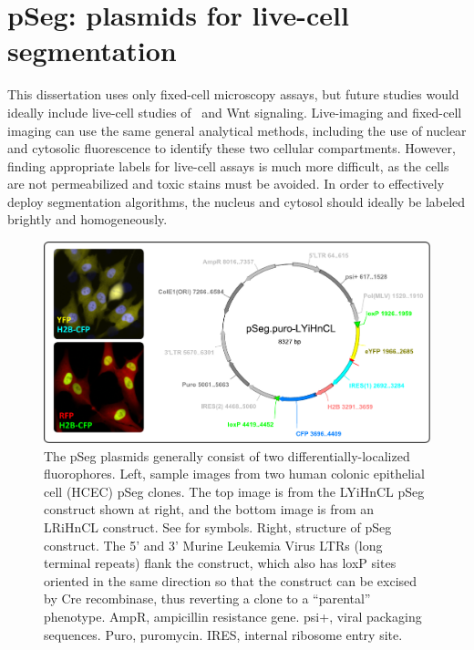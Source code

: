 \chapter[The pSeg plasmid library]{pSeg: plasmids for live-cell segmentation}
\label{pseg}

This dissertation uses only fixed-cell microscopy
assays, but future studies would ideally include
live-cell studies of \tgfbsf\ and Wnt signaling.
Live-imaging and fixed-cell imaging can use the same
general analytical methods,
including the use of nuclear and cytosolic fluorescence
to identify these two cellular compartments. However,
finding appropriate labels for live-cell assays is much more difficult,
as the cells are not permeabilized and toxic stains must
be avoided. In order to effectively deploy segmentation
algorithms, the nucleus and cytosol should ideally be labeled
brightly and homogeneously.


 \begin{figure}[!b]
  \centering
  \includegraphics[width=6in]{FIGS/pseg/structure.pdf}
  {\singlespacing 
  \caption[ pSeg structure and sample images.]
            { The pSeg plasmids generally consist of two
            differentially-localized fluorophores. Left, sample
            images from two human colonic
            epithelial cell (HCEC) pSeg clones. The top image is from
            the LYiHnCL pSeg construct shown at right,
            and the bottom image is from an LRiHnCL construct.
            See  for symbols.
            Right, structure of pSeg construct. The 5' and
            3' Murine Leukemia Virus LTRs
            (long terminal repeats) flank the
            construct, which also has loxP sites oriented
            in the same direction so that the construct
            can be excised by Cre recombinase, thus reverting
            a clone to a ``parental'' phenotype. AmpR, ampicillin
            resistance gene. psi+, viral packaging sequences. Puro,
            puromycin. IRES, internal ribosome entry site.}
  \label{fig:pseg:structure}}
  \end{figure}

